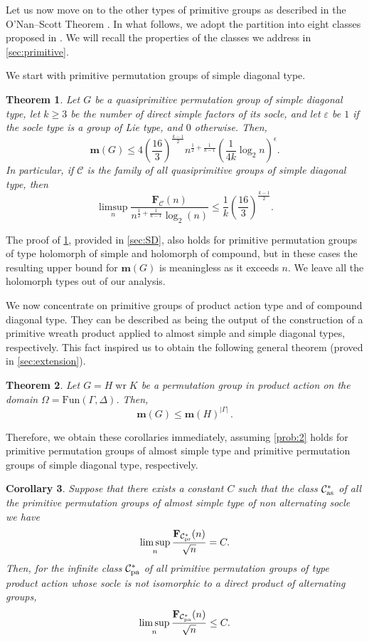 \documentclass[a4paper]{amsart}
\newcommand{\Fun}{\mathrm{Fun}}
\renewcommand{\wr}{\mathop{\mathrm{wr}}}
\newcommand{\F}{\mathbf{F}}
\newcommand{\m}{\mathbf{m}}
\newcommand{\C}{\mathcal{C}}
\newtheorem{thmx}{Theorem}[]
\newtheorem{corx}[thmx]{Corollary}
\theoremstyle{definition}
\begin{document}
Let us now move on to the other types of primitive groups as described in the O'Nan–Scott Theorem \cite{LiebeckPraegerSaxl1988}. In what follows, we adopt the partition into eight classes proposed in \cite{Praeger1997}. We will recall the properties of the classes we address in \cref{sec:primitive}.

We start with primitive permutation groups of simple diagonal type.
\begin{thmx}\label{thm:SD}
    Let $G$ be a quasiprimitive permutation group of simple diagonal type, let $k\ge 3$ be the number of direct simple factors of its socle, and let $\varepsilon$ be $1$ if the socle type is a group of Lie type, and $0$ otherwise. Then,
    \[ \m(G) \le 4 \left(\frac{16}{3}\right)^{\frac{k-1}{2}} n^{\frac{1}{2} + \frac{1}{k-1}} \left(\frac{1}{4k}\log_2 n\right)^\epsilon .\]
    In particular, if $\C$ is the family of all quasiprimitive groups of simple diagonal type, then
    \[ \limsup_n \frac{\F_\C(n)}{n^{\frac{1}{2} + \frac{1}{k-1}} \log_2(n) } \le \frac{1}{k} \left(\frac{16}{3}\right)^{\frac{k-1}{2}} .\]
\end{thmx}
The proof of \cref{thm:SD}, provided in \cref{sec:SD}, also holds for primitive permutation groups of type holomorph of simple and holomorph of compound, but in these cases the resulting upper bound for $\m(G)$ is meaningless as it exceeds $n$. We leave all the holomorph types out of our analysis.

We now concentrate on primitive groups of product action type and of compound diagonal type. They can be described as being the output of the construction of a primitive wreath product applied to almost simple and simple diagonal types, respectively. This fact inspired us to obtain the following general theorem (proved in \cref{sec:extension}). 
\begin{thmx}\label{thm:productAction}
    Let $G = H \wr K$ be a permutation group in product action on the domain $\Omega = \Fun (\Gamma, \Delta)$. Then,
    \[ \m(G) \le \m(H) ^{|\Gamma|} \,.\]
\end{thmx}

Therefore, we obtain these corollaries immediately, assuming \cref{prob:2} holds for primitive permutation groups of almost simple type and primitive permutation groups of simple diagonal type, respectively. 
\begin{corx}\label{cor:PA} %
    Suppose that there exists a constant $C$ such that the class $\mathcal{C}_{\rm as}^\ast$ of all the primitive permutation groups of almost simple type of non alternating socle we have \[ \limsup_n \frac{\F_{\C_{{\rm pr}}^\ast}(n)}{\sqrt{n}} = C.\] Then, for the infinite class $\C_{\rm pa}^\ast$ of all primitive permutation groups of type product action whose socle is not isomorphic to a direct product of alternating groups,
    \[ \limsup_n \frac{\F_{\C_{\rm pa}^\ast}(n)}{\sqrt{n}} \le C .\]
\end{corx}
\end{document}

